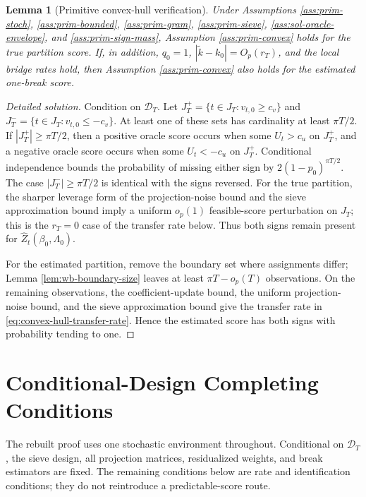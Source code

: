 \documentclass[12pt]{article}
\numberwithin{equation}{section}
\newtheorem{lemma}{Lemma}
\theoremstyle{definition}
\newcommand{\D}{\mathcal D}
\begin{document}
\begin{lemma}[Primitive convex-hull verification]
\label{lem:primitive-convex-hull}
Under Assumptions \ref{ass:prim-stoch}, \ref{ass:prim-bounded},
\ref{ass:prim-gram}, \ref{ass:prim-sieve}, \ref{ass:sol-oracle-envelope}, and
\ref{ass:prim-sign-mass}, Assumption \ref{ass:prim-convex} holds for the true
partition score.  If, in addition, \(q_0=1\),
\(|\widetilde k-k_0|=O_p(r_T)\), and the local bridge rates hold, then
Assumption \ref{ass:prim-convex} also holds for the estimated one-break score.
\end{lemma}

\begin{proof}[Detailed solution]
Condition on \(\D_T\).  Let \(J_T^+=\{t\in J_T:v_{t,0}\geq c_v\}\) and
\(J_T^-=\{t\in J_T:v_{t,0}\leq-c_v\}\).  At least one of these sets has
cardinality at least \(\pi T/2\).  If \(|J_T^+|\geq\pi T/2\), then a positive
oracle score occurs when some \(U_t>c_u\) on \(J_T^+\), and a negative oracle
score occurs when some \(U_t<-c_u\) on \(J_T^+\).  Conditional independence
bounds the probability of missing either sign by \(2(1-p_0)^{\pi T/2}\).  The
case \(|J_T^-|\geq\pi T/2\) is identical with the signs reversed.  For the true partition, the sharper leverage form of the projection-noise bound
and the sieve approximation bound imply a uniform \(o_p(1)\) feasible-score
perturbation on \(J_T\); this is the \(r_T=0\) case of the transfer rate below.
Thus both signs remain present for \(\widehat Z_t(\beta_0,\Lambda_0)\).

For the estimated partition, remove the boundary set where assignments differ;
Lemma \ref{lem:wb-boundary-size} leaves at least \(\pi T-o_p(T)\) observations.
On the remaining observations, the coefficient-update bound, the uniform
projection-noise bound, and the sieve approximation bound give the transfer rate
in \eqref{eq:convex-hull-transfer-rate}.  Hence the estimated score has both
signs with probability tending to one.
\end{proof}


\section{Conditional-Design Completing Conditions}
\label{sec:rigour-audit}

The rebuilt proof uses one stochastic environment throughout.  Conditional on
\(\D_T\), the sieve design, all projection matrices, residualized weights, and
break estimators are fixed.  The remaining conditions below are rate and
identification conditions; they do not reintroduce a predictable-score route.
\end{document}
